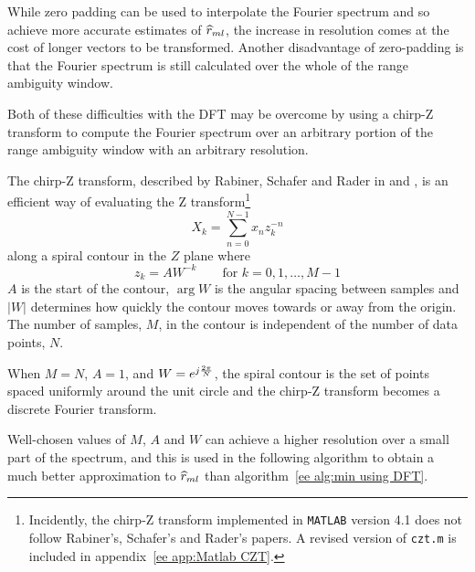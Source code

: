 While zero padding can be used to interpolate the Fourier spectrum and so 
achieve more accurate estimates of $\widehat{r}_{ml}$, the increase in resolution comes
at the cost of longer vectors to be transformed.  Another disadvantage of
zero-padding is that the Fourier spectrum is still calculated over the whole
of the range ambiguity window.

Both of these difficulties with the DFT may be overcome by using a chirp-Z
transform to compute the Fourier spectrum over an arbitrary portion of the
range ambiguity window with an arbitrary resolution.

The chirp-Z transform, described by Rabiner, Schafer and Rader in
\cite{Rab69b} and \cite{Rab69a}, is an efficient way of evaluating the 
Z transform\footnote{Incidently, the chirp-Z transform implemented in 
{\tt MATLAB} version 4.1 does not follow Rabiner's, Schafer's and Rader's
papers.  A revised version of {\tt czt.m} is included in
appendix~\protect\ref{ee app:Matlab CZT}.} 
\begin{equation}
X_k=\sum_{n=0}^{N-1}x_nz_k^{-n}
\end{equation}
along a spiral contour in the $Z$ plane where
\begin{equation}
z_k=AW^{-k}\qquad \mbox{for $k=0,1,\ldots,M-1$}
\end{equation}
$A$ is the start of the contour, $\arg W$ is the angular spacing between
samples and $\left|W\right|$ determines how quickly the contour moves 
towards or away from the origin.  The number of samples, $M$, in the contour
is independent of the number of data points, $N$.

When $M=N$, $A=1$, and $W={e^{j\frac{2\pi}{N}}}$, the spiral contour is the
set of points spaced uniformly around the unit circle and the chirp-Z
transform becomes a discrete Fourier transform. 

Well-chosen values of $M$, $A$ and $W$ can achieve a higher resolution over 
a small part of the spectrum, and this is used in the following algorithm to
obtain a much better approximation to $\widehat{r}_{ml}$ than 
algorithm~\ref{ee alg:min using DFT}. 

